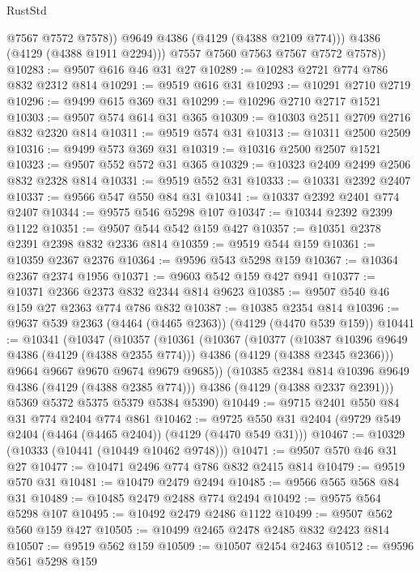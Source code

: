 \begin{lexlean}{RustStd}
\begin{coremodule}
{\begin{coremodule}
{{{{{{{{{{{{{{                @7567
                @7572
                @7578))
            @9649
            @4386
            (@4129 (@4388 @2109 @774)))
          @4386
          (@4129 (@4388 @1911 @2294)))
        @7557
        @7560
        @7563
        @7567
        @7572
        @7578))
@10283 := @9507 @616 @46 @31 @27
@10289 := @10283 @2721 @774 @786 @832 @2312 @814
@10291 := @9519 @616 @31
@10293 := @10291 @2710 @2719
@10296 := @9499 @615 @369 @31
@10299 := @10296 @2710 @2717 @1521
@10303 := @9507 @574 @614 @31 @365
@10309 := @10303 @2511 @2709 @2716 @832 @2320 @814
@10311 := @9519 @574 @31
@10313 := @10311 @2500 @2509
@10316 := @9499 @573 @369 @31
@10319 := @10316 @2500 @2507 @1521
@10323 := @9507 @552 @572 @31 @365
@10329 := @10323 @2409 @2499 @2506 @832 @2328 @814
@10331 := @9519 @552 @31
@10333 := @10331 @2392 @2407
@10337 := @9566 @547 @550 @84 @31
@10341 := @10337 @2392 @2401 @774 @2407
@10344 := @9575 @546 @5298 @107
@10347 := @10344 @2392 @2399 @1122
@10351 := @9507 @544 @542 @159 @427
@10357 := @10351 @2378 @2391 @2398 @832 @2336 @814
@10359 := @9519 @544 @159
@10361 := @10359 @2367 @2376
@10364 := @9596 @543 @5298 @159
@10367 := @10364 @2367 @2374 @1956
@10371 := @9603 @542 @159 @427 @941
@10377 := @10371 @2366 @2373 @832 @2344 @814 @9623
@10385 := @9507 @540 @46 @159 @27 @2363 @774 @786 @832
@10387 := @10385 @2354 @814
@10396 := @9637 @539 @2363 (@4464 (@4465 @2363)) (@4129 (@4470 @539 @159))
@10441 := @10341
    (@10347
      (@10357
        (@10361
          (@10367
            (@10377
              (@10387 @10396 @9649 @4386 (@4129 (@4388 @2355 @774)))
              @4386
              (@4129 (@4388 @2345 @2366)))
            @9664
            @9667
            @9670
            @9674
            @9679
            @9685))
        (@10385 @2384 @814 @10396 @9649 @4386 (@4129 (@4388 @2385 @774)))
        @4386
        (@4129 (@4388 @2337 @2391)))
      @5369
      @5372
      @5375
      @5379
      @5384
      @5390)
@10449 := @9715 @2401 @550 @84 @31 @774 @2404 @774 @861
@10462 := @9725 @550 @31 @2404 (@9729 @549 @2404 (@4464 (@4465 @2404)) (@4129 (@4470 @549 @31)))
@10467 := @10329 (@10333 (@10441 (@10449 @10462 @9748)))
@10471 := @9507 @570 @46 @31 @27
@10477 := @10471 @2496 @774 @786 @832 @2415 @814
@10479 := @9519 @570 @31
@10481 := @10479 @2479 @2494
@10485 := @9566 @565 @568 @84 @31
@10489 := @10485 @2479 @2488 @774 @2494
@10492 := @9575 @564 @5298 @107
@10495 := @10492 @2479 @2486 @1122
@10499 := @9507 @562 @560 @159 @427
@10505 := @10499 @2465 @2478 @2485 @832 @2423 @814
@10507 := @9519 @562 @159
@10509 := @10507 @2454 @2463
@10512 := @9596 @561 @5298 @159
}}}}}}}}}}}}}}
\end{coremodule}}
\end{coremodule}
\end{lexlean}
